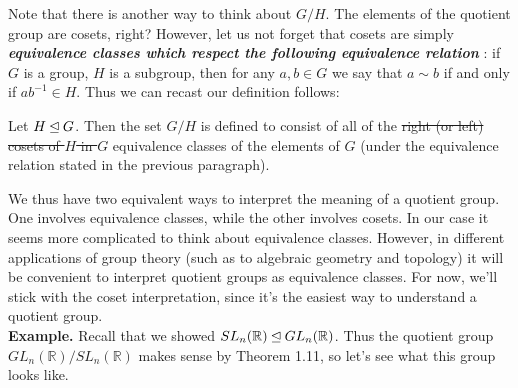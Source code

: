    {\color{NavyBlue} Note that there is another way to think about $G/H$. The elements
    of the quotient group are cosets, right? However, let us not forget
   that cosets are simply \textbf{\textit{equivalence classes which
   respect the following equivalence relation}} }: {\color{Black} if $G$ is a group, $H$ is a
   subgroup, then for any $a, b \in G$ we say that $a \sim
    b$ if and only if $ab^{-1} \in H$.} {\color{NavyBlue} Thus we can
    recast our definition follows:}
    \\
    
    \begingroup
    \par
    \rightskip\leftskip
    \noindent Let $H \unlhd G$. Then the set $G/H$ is defined to consist of all
    of the
    \sout{right (or left) cosets of $H$ in $G$} equivalence classes of
    the elements of $G$ (under the equivalence relation stated in the
    previous paragraph). 
    \par
    \endgroup
    \vspace{1cm}

    {\color{Violet}We thus have two equivalent ways to interpret the meaning of a
    quotient group. One involves equivalence classes, while the other
    involves cosets. In our case it seems more complicated to think
    about equivalence classes.
    However, in different applications of group theory (such
    as to algebraic geometry and topology) it will be convenient to
    interpret quotient groups as equivalence classes. For now, we'll
    stick with the coset interpretation, since it's the easiest way to
    understand a quotient group.
    }
    \\ 

    \textbf{Example.} Recall that we showed $SL_n(\mathbb{R}) \unlhd
    GL_n(\mathbb{R})$. Thus the quotient group
    $GL_n(\mathbb{R})/SL_n(\mathbb{R})$ makes sense by Theorem 1.11,
    so let's see what this group looks like.

